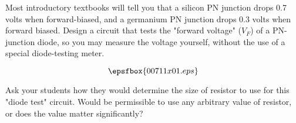 

Most introductory textbooks will tell you that a silicon PN junction drops 0.7 volts when forward-biased, and a germanium PN junction drops 0.3 volts when forward biased.  Design a circuit that tests the "forward voltage" ($V_F$) of a PN-junction diode, so you may measure the voltage yourself, without the use of a special diode-testing meter.







$$\epsfbox{00711x01.eps}$$







Ask your students how they would determine the size of resistor to use for this "diode test" circuit.  Would be permissible to use any arbitrary value of resistor, or does the value matter significantly?




